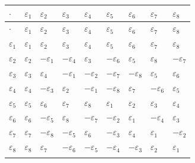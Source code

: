 \documentclass[10pt,a4paper]{article}
\begin{document}
{\footnotesize
\begin{longtable}{>{\raggedright\arraybackslash}p{}>{\raggedright\arraybackslash}p{}>{\raggedright\arraybackslash}p{}>{\raggedright\arraybackslash}p{}>{\raggedright\arraybackslash}p{}>{\raggedright\arraybackslash}p{}>{\raggedright\arraybackslash}p{}>{\raggedright\arraybackslash}p{}>{\raggedright\arraybackslash}p{}}
\toprule
\textbf{$\cdot$} & \textbf{$\varepsilon_{1}$} & \textbf{$\varepsilon_{2}$} & \textbf{$\varepsilon_{3}$} & \textbf{$\varepsilon_{4}$} & \textbf{$\varepsilon_{5}$} & \textbf{$\varepsilon_{6}$} & \textbf{$\varepsilon_{7}$} & \textbf{$\varepsilon_{8}$} \\
\midrule\endfirsthead
\toprule
\textbf{$\cdot$} & \textbf{$\varepsilon_{1}$} & \textbf{$\varepsilon_{2}$} & \textbf{$\varepsilon_{3}$} & \textbf{$\varepsilon_{4}$} & \textbf{$\varepsilon_{5}$} & \textbf{$\varepsilon_{6}$} & \textbf{$\varepsilon_{7}$} & \textbf{$\varepsilon_{8}$} \\
\midrule\endhead
\endfoot
\bottomrule\endlastfoot
$\varepsilon_{1}$ & $\varepsilon_{1}$ & $\varepsilon_{2}$ & $\varepsilon_{3}$ & $\varepsilon_{4}$ & $\varepsilon_{5}$ & $\varepsilon_{6}$ & $\varepsilon_{7}$ & $\varepsilon_{8}$ \\
$\varepsilon_{2}$ & $\varepsilon_{2}$ & $-\varepsilon_{1}$ & $-\varepsilon_{4}$ & $\varepsilon_{3}$ & $-\varepsilon_{6}$ & $\varepsilon_{5}$ & $\varepsilon_{8}$ & $-\varepsilon_{7}$ \\
$\varepsilon_{3}$ & $\varepsilon_{3}$ & $\varepsilon_{4}$ & $-\varepsilon_{1}$ & $-\varepsilon_{2}$ & $-\varepsilon_{7}$ & $-\varepsilon_{8}$ & $\varepsilon_{5}$ & $\varepsilon_{6}$ \\
$\varepsilon_{4}$ & $\varepsilon_{4}$ & $-\varepsilon_{3}$ & $\varepsilon_{2}$ & $-\varepsilon_{1}$ & $-\varepsilon_{8}$ & $\varepsilon_{7}$ & $-\varepsilon_{6}$ & $\varepsilon_{5}$ \\
$\varepsilon_{5}$ & $\varepsilon_{5}$ & $\varepsilon_{6}$ & $\varepsilon_{7}$ & $\varepsilon_{8}$ & $\varepsilon_{1}$ & $\varepsilon_{2}$ & $\varepsilon_{3}$ & $\varepsilon_{4}$ \\
$\varepsilon_{6}$ & $\varepsilon_{6}$ & $-\varepsilon_{5}$ & $\varepsilon_{8}$ & $-\varepsilon_{7}$ & $-\varepsilon_{2}$ & $\varepsilon_{1}$ & $-\varepsilon_{4}$ & $\varepsilon_{3}$ \\
$\varepsilon_{7}$ & $\varepsilon_{7}$ & $-\varepsilon_{8}$ & $-\varepsilon_{5}$ & $\varepsilon_{6}$ & $-\varepsilon_{3}$ & $\varepsilon_{4}$ & $\varepsilon_{1}$ & $-\varepsilon_{2}$ \\
$\varepsilon_{8}$ & $\varepsilon_{8}$ & $\varepsilon_{7}$ & $-\varepsilon_{6}$ & $-\varepsilon_{5}$ & $-\varepsilon_{4}$ & $-\varepsilon_{3}$ & $\varepsilon_{2}$ & $\varepsilon_{1}$ \\*
\end{longtable}}
\end{document}
